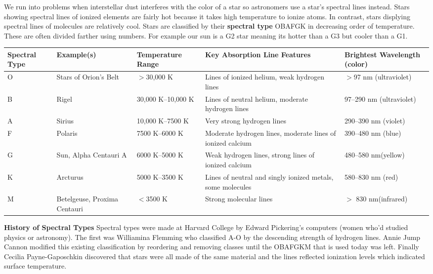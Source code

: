 We run into problems when interstellar dust interferes with the color of a star so astronomers use a star's spectral lines instead. Stars showing spectral lines of ionized elements are fairly hot because it takes high temperature to ionize atoms. In contrast, stars displying spectral lines of molecules are relatively cool. Stars are classified by their \textbf{spectral type} OBAFGK in decreasing order of temperature. These are often divided farther using numbers. For example our sun is a G2 star meaning its hotter than a G3 but cooler than a G1.

\begin{tabular}{|p{1cm}|p{2cm}|l|p{4cm}|p{4cm}|}
\hline
Spectral Type & Example(s) & Temperature Range & Key Absorption Line Features & Brightest Wavelength (color) \\
\hline
O & Stars of Orion’s Belt & $>$30,000 K & Lines of ionized helium, weak hydrogen lines & $>$97 nm (ultraviolet) \\
\hline
B & Rigel & 30,000 K$–$10,000 K & Lines of neutral helium, moderate hydrogen lines & 97$–$290 nm (ultraviolet) \\
\hline
A & Sirius & 10,000 K$–$7500 K & Very strong hydrogen lines & 290$–$390 nm (violet) \\
\hline
F & Polaris & 7500 K$–$6000 K & Moderate hydrogen lines, moderate lines of ionized calcium & 390$–$480 nm (blue) \\
\hline
G & Sun, Alpha Centauri A & 6000 K$–$5000 K & Weak hydrogen lines, strong lines of ionized calcium & 480$–$580 nm(yellow) \\
\hline
K & Arcturus & 5000 K$–$3500 K & Lines of neutral and singly ionized metals, some molecules & 580$–$830 nm (red) \\
\hline
M & Betelgeuse, Proxima Centauri & $<$3500 K & Strong molecular lines & $>$ 830 nm(infrared) \\
\hline
\end{tabular}

\textbf{History of Spectral Types}
Spectral types were made at Harvard College by Edward Pickering's computers (women who'd studied physics or astronomy). The first was Williamina Flemming who classified A-O by the descending strength of hydrogen lines. Annie Jump Cannon modified this existing classification by reordering and removing classes until the OBAFGKM that is used today was left. Finally Cecilia Payne-Gaposchkin discovered that stars were all made of the same material and the lines reflected ionization levels which indicated surface temperature.

